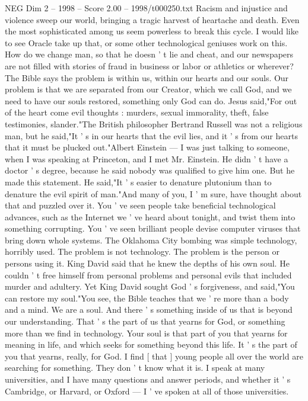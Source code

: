\begin{textsample}{NEG Dim 2 – 1998 – Score 2.00 – 1998/t000250.txt}
Racism and injustice and violence sweep our world, bringing a tragic harvest of heartache and death.
Even the most sophisticated among us seem powerless to break this cycle.
I would like to see Oracle take up that, or some other technological geniuses work on this.
How do we change man, so that he doesn ' t lie and cheat, and our newspapers are not filled with stories of fraud in business or labor or athletics or wherever?
The Bible says the problem is within us, within our hearts and our souls.
Our problem is that we are separated from our Creator, which we call God, and we need to have our souls restored, something only God can do.
Jesus said,"For out of the heart come evil thoughts : murders, sexual immorality, theft, false testimonies, slander."The British philosopher Bertrand Russell was not a religious man, but he said,"It ' s in our hearts that the evil lies, and it ' s from our hearts that it must be plucked out."Albert Einstein — I was just talking to someone, when I was speaking at Princeton, and I met Mr.
Einstein.
He didn ' t have a doctor ' s degree, because he said nobody was qualified to give him one.
But he made this statement.
He said,"It ' s easier to denature plutonium than to denature the evil spirit of man."And many of you, I ' m sure, have thought about that and puzzled over it.
You ' ve seen people take beneficial technological advances, such as the Internet we ' ve heard about tonight, and twist them into something corrupting.
You ' ve seen brilliant people devise computer viruses that bring down whole systems.
The Oklahoma City bombing was simple technology, horribly used.
The problem is not technology.
The problem is the person or persons using it.
King David said that he knew the depths of his own soul.
He couldn ' t free himself from personal problems and personal evils that included murder and adultery.
Yet King David sought God ' s forgiveness, and said,"You can restore my soul."You see, the Bible teaches that we ' re more than a body and a mind.
We are a soul.
And there ' s something inside of us that is beyond our understanding.
That ' s the part of us that yearns for God, or something more than we find in technology.
Your soul is that part of you that yearns for meaning in life, and which seeks for something beyond this life.
It ' s the part of you that yearns, really, for God.
I find [ that ] young people all over the world are searching for something.
They don ' t know what it is.
I speak at many universities, and I have many questions and answer periods, and whether it ' s Cambridge, or Harvard, or Oxford — I ' ve spoken at all of those universities.

\end{textsample}
